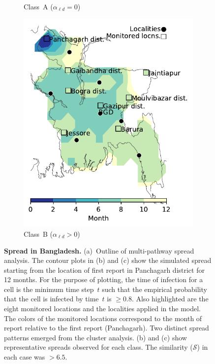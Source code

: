 \documentclass[11pt]{article}
\newcommand{\similarity}{\mathcal{S}}
\newcommand{\ald}{\alpha_{\ell d}}
\theoremstyle{definition}
\begin{document}
\begin{figure}[!ht]
\begin{subfigure}[b]{.4\textwidth}
    \caption{Class~A ($\ald=0$) \label{fig:bgdClassA}}
\end{subfigure}\hspace{.5cm}
\begin{subfigure}[b]{.4\textwidth}
    \includegraphics[width=\textwidth]{../cellular_automata/results/contour/BGD_model-B_m1_l3.pdf}
    \caption{Class~B ($\ald>0$) \label{fig:bgdClassB1}}
\end{subfigure}
\caption{\textbf{Spread in Bangladesh.} (a)~Outline of multi-pathway spread
analysis. The contour plots in (b) and (c) show the simulated spread
starting from the location of first report in Panchagarh district for 12
months. For the purpose of plotting, the time of infection for a cell is
the minimum time step~$t$ such that the empirical probability that the cell
is infected by time~$t$ is $\ge0.8$. Also highlighted are the eight
monitored locations and the localities applied in the model. The colors of
the monitored locations correspond to the month of report relative to the
first report (Panchagarh). Two distinct spread patterns emerged from the
cluster analysis. (b) and (c) show representative spreads observed for
each class. The similarity ($\similarity$) in each case was $>6.5$.}
\end{figure}
\end{document}
